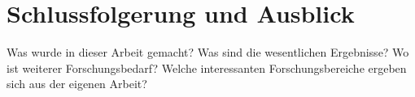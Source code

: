 \chapter{Schlussfolgerung und Ausblick}
\label{Conclusion}
Was wurde in dieser Arbeit gemacht? Was sind die wesentlichen Ergebnisse? Wo ist weiterer Forschungsbedarf? Welche interessanten Forschungsbereiche ergeben sich aus der eigenen Arbeit?